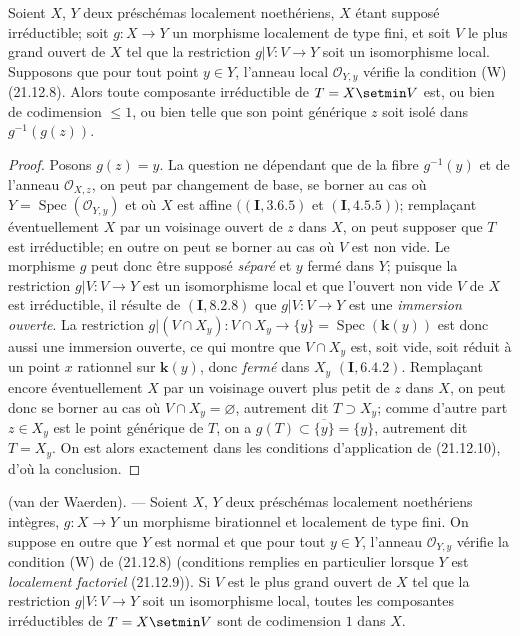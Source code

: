 \begin{corollary}[21.12.11]
\label{IV.21.12.11}
Soient $X$, $Y$ deux préschémas localement noethériens, $X$ étant supposé
irréductible; soit $g:X\to Y$ un morphisme localement de type fini, et soit $V$ le plus
grand ouvert de $X$ tel que la restriction $g|V:V\to Y$ soit un isomorphisme local.
Supposons que pour tout point $y\in Y$, l'anneau local $\mathcal O_{Y,y}$ vérifie la
condition \textup{(W) (21.12.8)}. Alors toute composante irréductible de $T=X\setmin V$ est, \textup{ou bien}
de codimension $\leq1$, \textup{ou bien} telle que son point générique $z$ soit isolé dans
$g^{-1}(g(z))$.
\end{corollary}

\begin{proof}
Posons $g(z)=y$. La question ne dépendant que de la fibre $g^{-1}(y)$ et de l'anneau
$\mathcal O_{X,z}$, on peut par changement de base, se borner au cas où
$Y=\operatorname{Spec}(\mathcal O_{Y,y})$ et où $X$ est affine
$((\mathbf I, 3.6.5)$ et $(\mathbf I, 4.5.5))$; remplaçant éventuellement $X$ par un
voisinage ouvert de $z$ dans $X$, on peut supposer que $T$ est irréductible; en outre on
peut se borner au cas où $V$ est non vide. Le morphisme $g$ peut donc être supposé
\emph{séparé} et $y$ fermé dans $Y$; puisque la restriction $g|V:V\to Y$ est un isomorphisme
local et que l'ouvert non vide $V$ de $X$ est irréductible, il résulte de
$(\mathbf I, 8.2.8)$ que $g|V:V\to Y$ est une \emph{immersion ouverte}. La restriction
$g|(V\cap X_y):V\cap X_y\to\{y\}=\operatorname{Spec}(\boldsymbol{k}(y))$ est donc aussi une
immersion ouverte, ce qui montre que $V\cap X_y$ est, soit vide, soit réduit à un point
$x$ rationnel
sur $\boldsymbol{k}(y)$, donc \emph{fermé} dans $X_y$ $(\mathbf I, 6.4.2)$. Remplaçant encore
éventuellement $X$ par un voisinage ouvert plus petit de $z$ dans $X$, on peut donc se
borner au cas où $V\cap X_y=\varnothing$, autrement dit $T\supset X_y$; comme d'autre
part $z\in X_y$ est le point générique de $T$, on a
$g(T)\subset\overline{\{y\}}=\{y\}$, autrement dit $T=X_y$. On est alors exactement
dans les conditions d'application de (21.12.10), d'où la conclusion.
\end{proof}

\begin{theorem}[21.12.12]
\label{IV.21.12.12}
\textup{(van der Waerden)}. ---
Soient $X$, $Y$ deux préschémas localement noethériens intègres, $g:X\to Y$ un
morphisme birationnel et localement de type fini. On suppose en outre que $Y$ est
normal et que pour tout $y\in Y$, l'anneau $\mathcal O_{Y,y}$ vérifie la condition \textup{(W)}
de \textup{(21.12.8)} \textup{(conditions remplies en particulier lorsque $Y$ est \emph{localement factoriel}
(21.12.9))}. Si $V$ est le plus grand ouvert de $X$ tel que la restriction
$g|V:V\to Y$ soit un isomorphisme local, toutes les composantes irréductibles de
$T=X\setmin V$ sont de codimension $1$ dans $X$.
\end{theorem}

